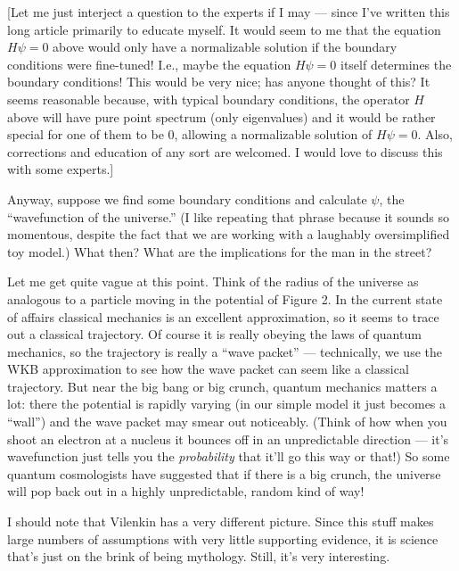 \documentclass{article}
\def\tightlist{}
\renewcommand{\texttt}[1]{%
  \begingroup
  \ttfamily
  \begingroup\lccode`~=`/\lowercase{\endgroup\def~}{/\discretionary{}{}{}}%
  \begingroup\lccode`~=`[\lowercase{\endgroup\def~}{[\discretionary{}{}{}}%
  \begingroup\lccode`~=`.\lowercase{\endgroup\def~}{.\discretionary{}{}{}}%
  \catcode`/=\active\catcode`[=\active\catcode`.=\active
  \scantokens{#1\noexpand}%
  \endgroup
}
\begin{document}
{[}Let me just interject a question to the experts if I may --- since
I've written this long article primarily to educate myself. It would
seem to me that the equation \(H \psi = 0\) above would only have a
normalizable solution if the boundary conditions were fine-tuned! I.e.,
maybe the equation \(H \psi = 0\) itself determines the boundary
conditions! This would be very nice; has anyone thought of this? It
seems reasonable because, with typical boundary conditions, the operator
\(H\) above will have pure point spectrum (only eigenvalues) and it
would be rather special for one of them to be \(0\), allowing a
normalizable solution of \(H \psi = 0\). Also, corrections and education
of any sort are welcomed. I would love to discuss this with some
experts.{]}

Anyway, suppose we find some boundary conditions and calculate \(\psi\),
the ``wavefunction of the universe.'' (I like repeating that phrase
because it sounds so momentous, despite the fact that we are working
with a laughably oversimplified toy model.) What then? What are the
implications for the man in the street?

Let me get quite vague at this point. Think of the radius of the
universe as analogous to a particle moving in the potential of Figure 2.
In the current state of affairs classical mechanics is an excellent
approximation, so it seems to trace out a classical trajectory. Of
course it is really obeying the laws of quantum mechanics, so the
trajectory is really a ``wave packet'' --- technically, we use the WKB
approximation to see how the wave packet can seem like a classical
trajectory. But near the big bang or big crunch, quantum mechanics
matters a lot: there the potential is rapidly varying (in our simple
model it just becomes a ``wall'') and the wave packet may smear out
noticeably. (Think of how when you shoot an electron at a nucleus it
bounces off in an unpredictable direction --- it's wavefunction just
tells you the \emph{probability} that it'll go this way or that!) So
some quantum cosmologists have suggested that if there is a big crunch,
the universe will pop back out in a highly unpredictable, random kind of
way!

I should note that Vilenkin has a very different picture. Since this
stuff makes large numbers of assumptions with very little supporting
evidence, it is science that's just on the brink of being mythology.
Still, it's very interesting.

\end{document}
